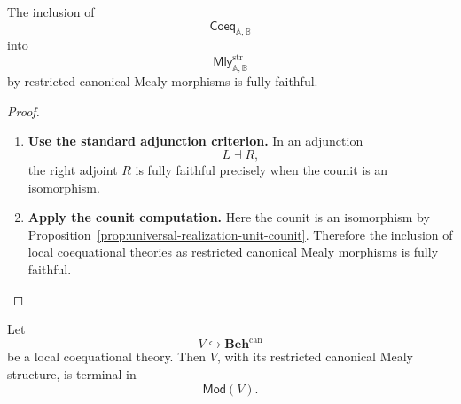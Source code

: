 \begin{corollary}
\label{cor:universal-realization-fully-faithful}
    The inclusion of
    \[
        \mathsf{Coeq}_{\mathbb A,\mathbb B}
    \]
    into
    \[
        \mathsf{Mly}^{\mathrm{str}}_{\mathbb A,\mathbb B}
    \]
    by restricted canonical Mealy morphisms is fully faithful.
\end{corollary}

\begin{proof}
    \leavevmode
    \begin{enumerate}
        \item \textbf{Use the standard adjunction criterion.}
        In an adjunction
        \[
            L\dashv R,
        \]
        the right adjoint \(R\) is fully faithful precisely when the counit is
        an isomorphism.

        \item \textbf{Apply the counit computation.}
        Here the counit is an isomorphism by
        Proposition~\ref{prop:universal-realization-unit-counit}. Therefore
        the inclusion of local coequational theories as restricted canonical
        Mealy morphisms is fully faithful.
    \end{enumerate}
\end{proof}

\begin{corollary}
\label{cor:terminal-realization-coequational-theory}
    Let
    \[
        V\hookrightarrow\mathbf{Beh}^{\mathrm{can}}
    \]
    be a local coequational theory. Then \(V\), with its restricted canonical
    Mealy structure, is terminal in
    \[
        \mathsf{Mod}(V).
    \]
\end{corollary}


